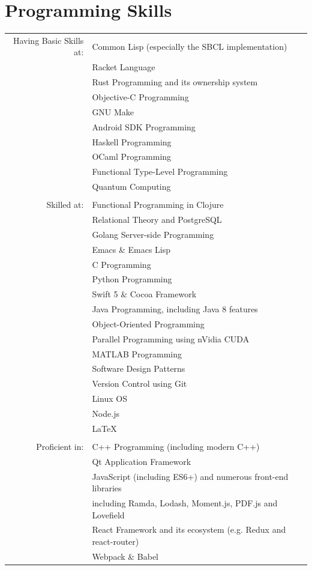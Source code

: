 \documentclass[a4paper,10pt]{article}
\begin{document}
\section{Programming Skills}
\begin{tabular}{rl}
Having Basic Skills at:
					& Common Lisp (especially the SBCL implementation)\\
					& Racket Language\\
					& Rust Programming and its ownership system\\
					& Objective-C Programming\\
					& GNU Make\\
					& Android SDK Programming\\
					& Haskell Programming\\
					& OCaml Programming\\
					& Functional Type-Level Programming\\
					& Quantum Computing\\
					\\
Skilled at:
				& Functional Programming in Clojure\\
				& Relational Theory and PostgreSQL\\
				& Golang Server-side Programming\\
				& Emacs \& Emacs Lisp\\
				& C Programming\\
				& Python Programming\\
				& Swift 5 \& Cocoa Framework\\
				& Java Programming, including Java 8 features\\
				& Object-Oriented Programming\\
                & Parallel Programming using nVidia CUDA\\
				& MATLAB Programming\\
				& Software Design Patterns\\
				& Version Control using Git\\
				& Linux OS\\
				& Node.js\\
				& {\fb \LaTeX}\\%
				\\
Proficient in: & C++ Programming (including modern C++)\\
				& Qt Application Framework\\
				& JavaScript (including ES6+) and numerous front-end libraries\\
				& \hspace{1cm} including Ramda, Lodash, Moment.js, PDF.js and Lovefield\\
				& React Framework and its ecosystem (e.g. Redux and react-router)\\
				& Webpack \& Babel

\end{tabular}
\end{document}
